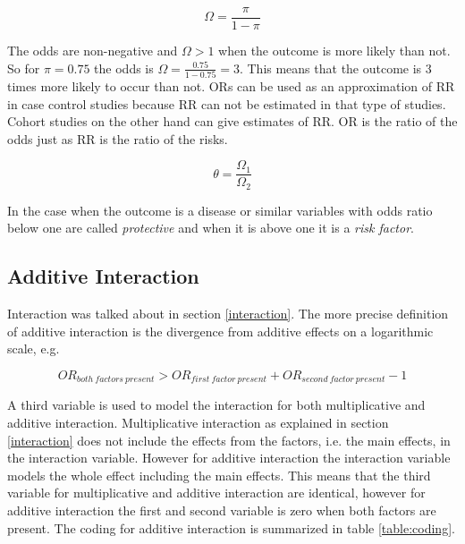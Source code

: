 \documentclass[10pt,a4paper]{report}
\begin{document}
\begin{equation}\label{eq:odds}
\Omega=\frac{\pi}{1-\pi}
\end{equation}

The odds are non-negative and $\Omega>1$ when the outcome is more likely than not\cite{agresti_categorical}. So for $\pi=0.75$ the odds is $\Omega=\frac{0.75}{1-0.75}=3$. This means that the outcome is 3 times more likely to occur than not. ORs can be used as an approximation of RR in case control studies because RR can not be estimated in that type of studies\cite{or_mislead}. Cohort studies on the other hand can give estimates of RR\cite{or_mislead}. OR is the ratio of the odds just as RR is the ratio of the risks\cite{agresti_categorical}.

\begin{equation}\label{eq:odds_ratio}
\theta=\frac{\Omega_1}{\Omega_2}
\end{equation}

In the case when the outcome is a disease or similar variables with odds ratio below one are called \emph{protective} and when it is above one it is a \emph{risk factor}\cite{recoding_2011}.

\subsection{Additive Interaction}
\label{additive}
Interaction was talked about in section \ref{interaction}. The more precise definition of additive interaction is the divergence from additive effects on a logarithmic scale, e.g\cite{rothman2008modern}.

\begin{equation}
OR_{both\:factors\:present}>OR_{first\:factor\:present}+OR_{second\:factor\:present}-1
\end{equation}

A third variable is used to model the interaction for both multiplicative and additive interaction. Multiplicative interaction as explained in section \ref{interaction} does not include the effects from the factors, i.e. the main effects, in the interaction variable. However for additive interaction the interaction variable models the whole effect including the main effects. This means that the third variable for multiplicative and additive interaction are identical, however for additive interaction the first and second variable is zero when both factors are present. The coding for additive interaction is summarized in table \ref{table:coding}\cite{uvehag_master_thesis}.
\end{document}
